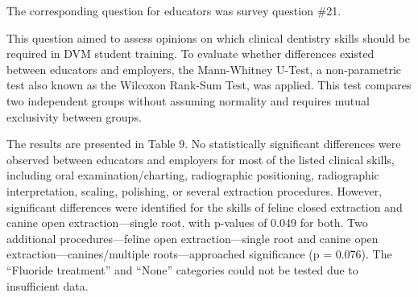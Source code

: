 \documentclass[
  11pt,
  letterpaper,
  DIV=11,
  numbers=noendperiod]{scrartcl}
\numberwithin{figure}{section}
\begin{document}
The corresponding question for educators was survey question \#21.

This question aimed to assess opinions on which clinical dentistry
skills should be required in DVM student training. To evaluate whether
differences existed between educators and employers, the Mann-Whitney
U-Test, a non-parametric test also known as the Wilcoxon Rank-Sum Test,
was applied. This test compares two independent groups without assuming
normality and requires mutual exclusivity between groups.

The results are presented in Table 9. No statistically significant
differences were observed between educators and employers for most of
the listed clinical skills, including oral examination/charting,
radiographic positioning, radiographic interpretation, scaling,
polishing, or several extraction procedures. However, significant
differences were identified for the skills of feline closed extraction
and canine open extraction---single root, with p-values of 0.049 for
both. Two additional procedures---feline open extraction---single root
and canine open extraction---canines/multiple roots---approached
significance (p = 0.076). The ``Fluoride treatment'' and ``None''
categories could not be tested due to insufficient data.
\end{document}

